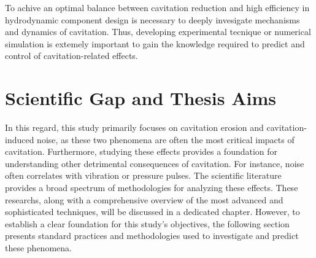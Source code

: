 To achive an optimal balance between cavitation reduction and high efficiency in hydrodynamic component design is necessary to deeply invesigate mechanisms and dynamics of cavitation. Thus, developing experimental tecnique or numerical simulation is extemely important to gain the knowledge required to predict and control of cavitation-related effects.

\section{Scientific Gap and Thesis Aims}

In this regard, this study primarily focuses on cavitation erosion and cavitation-induced noise, as these two phenomena are often the most critical impacts of cavitation. Furthermore, studying these effects provides a foundation for understanding other detrimental consequences of cavitation. For instance, noise often correlates with vibration or pressure pulses.
The scientific literature provides a broad spectrum of methodologies for analyzing these effects. These researchs, along with a comprehensive overview of the most advanced and sophisticated techniques, will be discussed in a dedicated chapter. However, to establish a clear foundation for this study’s objectives, the following section presents standard practices and methodologies used to investigate and predict these phenomena.

